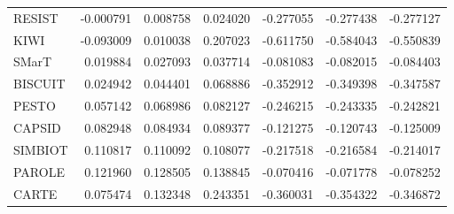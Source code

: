 \begin{tabular}{lrrrrrr}
RESIST      &           -0.000791 &           0.008758 &           0.024020 &           -0.277055 &          -0.277438 &          -0.277127 \\
KIWI        &           -0.093009 &           0.010038 &           0.207023 &           -0.611750 &          -0.584043 &          -0.550839 \\
SMarT       &            0.019884 &           0.027093 &           0.037714 &           -0.081083 &          -0.082015 &          -0.084403 \\
BISCUIT     &            0.024942 &           0.044401 &           0.068886 &           -0.352912 &          -0.349398 &          -0.347587 \\
PESTO       &            0.057142 &           0.068986 &           0.082127 &           -0.246215 &          -0.243335 &          -0.242821 \\
CAPSID      &            0.082948 &           0.084934 &           0.089377 &           -0.121275 &          -0.120743 &          -0.125009 \\
SIMBIOT     &            0.110817 &           0.110092 &           0.108077 &           -0.217518 &          -0.216584 &          -0.214017 \\
PAROLE      &            0.121960 &           0.128505 &           0.138845 &           -0.070416 &          -0.071778 &          -0.078252 \\
CARTE       &            0.075474 &           0.132348 &           0.243351 &           -0.360031 &          -0.354322 &          -0.346872 \\
\bottomrule
\end{tabular}
